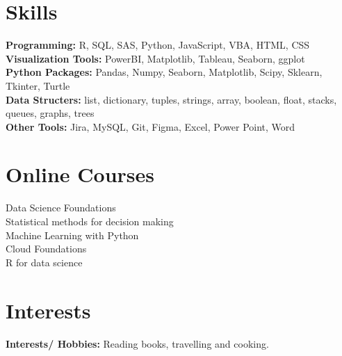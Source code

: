 \documentclass[]{resume}
\begin{document}
\section{Skills} 
\hrulefill
\begin{adjustwidth}{0.5cm}{0cm}
    \pt \textbf{Programming:} R, SQL, SAS, Python, JavaScript, VBA, HTML, CSS  \\
    \pt \textbf{Visualization Tools:} PowerBI, Matplotlib, Tableau, Seaborn, ggplot \\
    \pt \textbf{Python Packages: } Pandas, Numpy, Seaborn, Matplotlib, Scipy, Sklearn, Tkinter, Turtle \\
    \pt \textbf{Data Structers: } list, dictionary, tuples, strings, array, boolean, float, stacks, queues, graphs, trees \\
    \pt \textbf{Other Tools:} Jira, MySQL, Git, Figma, Excel, Power Point, Word \\
    
\end{adjustwidth}
\sectionsep

\section{Online Courses} 
\hrulefill
\begin{adjustwidth}{0.5cm}{0cm}
    \pt Data Science Foundations \\
    \pt Statistical methods for decision making \\
    \pt Machine Learning with Python \\
    \pt Cloud Foundations \\
    \pt R for data science \\
    
\end{adjustwidth}
\sectionsep

\section{Interests}
\hrulefill
\begin{adjustwidth}{0.5cm}{0cm}
\pt \textbf{Interests/ Hobbies:} Reading books, travelling and cooking. \\
\end{adjustwidth}


\end{document}
